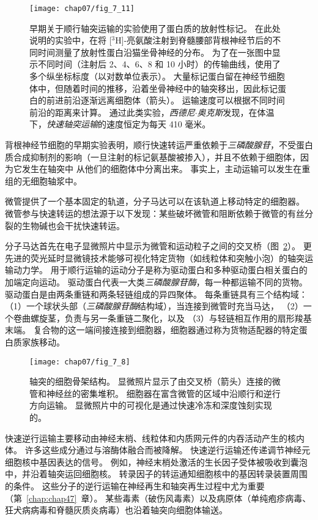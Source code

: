 \begin{figure}[htbp]
	\centering
	\texttt{[image: chap07/fig\_7\_11]}
	\caption{早期关于顺行轴突运输的实验使用了蛋白质的放射性标记。
		在此处说明的实验中，在将 [$^3$H]-亮氨酸注射到脊髓腰部背根神经节后的不同时间测量了放射性蛋白沿猫坐骨神经的分布。
		为了在一张图中显示不同时间（注射后 2、4、6、8 和 10 小时）的传输曲线，使用了多个纵坐标标度（以对数单位表示）。
		大量标记蛋白留在神经节细胞体中，但随着时间的推移，沿着坐骨神经中的轴突移出，因此标记蛋白的前进前沿逐渐远离细胞体（箭头）。
		运输速度可以根据不同时间前沿的距离来计算。
		通过此类实验，\textit{西德尼$\cdot$奥克斯}发现，在体温下，\textit{快速轴突运输}的速度恒定为每天 410 毫米\cite{ochs1972fast}。}
	\label{fig:7_11}
\end{figure}


背根神经节细胞的早期实验表明，顺行快速转运严重依赖于\textit{三磷酸腺苷}，不受蛋白质合成抑制剂的影响（一旦注射的标记氨基酸被掺入），并且不依赖于细胞体，因为它发生在轴突中 从他们的细胞体中分离出来。
事实上，主动运输可以发生在重组的无细胞轴浆中。


微管提供了一个基本固定的轨道，分子马达可以在该轨道上移动特定的细胞器。
微管参与快速转运的想法源于以下发现：某些破坏微管和阻断依赖于微管的有丝分裂的生物碱也会干扰快速转运。


分子马达首先在电子显微照片中显示为微管和运动粒子之间的交叉桥（图~\ref{fig:7_8}）。
更先进的荧光延时显微镜技术能够可视化特定货物（如线粒体和突触小泡）的轴突运输动力学。
用于顺行运输的运动分子是称为驱动蛋白和多种驱动蛋白相关蛋白的加端定向运动。
驱动蛋白代表一大类\textit{三磷酸腺苷酶}，每一种都运输不同的货物。
驱动蛋白是由两条重链和两条轻链组成的异四聚体。
每条重链具有三个结构域：
（1）一个球状头部（\textit{三磷酸腺苷酶}结构域），当连接到微管时充当马达，
（2）一个卷曲螺旋茎，负责与另一条重链二聚化，以及
（3）与轻链相互作用的扇形羧基末端。
复合物的这一端间接连接到细胞器，细胞器通过称为货物适配器的特定蛋白质家族移动。


\begin{figure}[htbp]
	\centering
	\texttt{[image: chap07/fig\_7\_8]}
	\caption{轴突的细胞骨架结构。
		显微照片显示了由交叉桥（箭头）连接的微管和神经丝的密集堆积。
		细胞器在富含微管的区域中沿顺行和逆行方向运输。
		显微照片中的可视化是通过快速冷冻和深度蚀刻实现的\cite{schnapp1982cytoplasmic}。}
	\label{fig:7_8}
\end{figure}


快速逆行运输主要移动由神经末梢、线粒体和内质网元件的内吞活动产生的核内体。
许多这些成分通过与溶酶体融合而被降解。
快速逆行运输还传递调节神经元细胞核中基因表达的信号。
例如，神经末梢处激活的生长因子受体被吸收到囊泡中，并沿着轴突运回细胞核。
转录因子的转运通知细胞核中的基因转录装置周围的条件。
这些分子的逆行运输在神经再生和轴突再生过程中尤为重要（第~\ref{chap:chap47}~章）。 
某些毒素（破伤风毒素）以及病原体（单纯疱疹病毒、狂犬病病毒和脊髓灰质炎病毒）也沿着轴突向细胞体输送。


